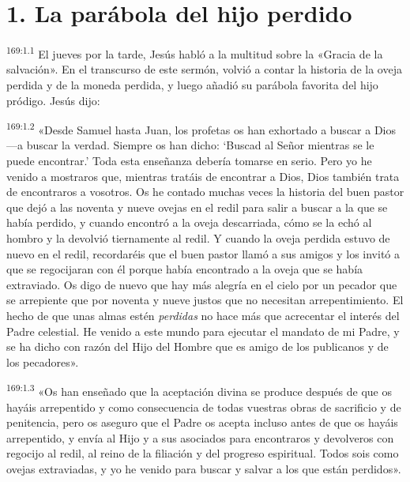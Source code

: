 \section*{1. La parábola del hijo perdido}
\par 
\textsuperscript{169:1.1} El jueves por la tarde, Jesús habló a la multitud sobre la «Gracia de la salvación». En el transcurso de este sermón, volvió a contar la historia de la oveja perdida y de la moneda perdida, y luego añadió su parábola favorita del hijo pródigo. Jesús dijo:

\par 
\textsuperscript{169:1.2} «Desde Samuel hasta Juan, los profetas os han exhortado a buscar a Dios ---a buscar la verdad. Siempre os han dicho: `Buscad al Señor mientras se le puede encontrar.' Toda esta enseñanza debería tomarse en serio. Pero yo he venido a mostraros que, mientras tratáis de encontrar a Dios, Dios también trata de encontraros a vosotros. Os he contado muchas veces la historia del buen pastor que dejó a las noventa y nueve ovejas en el redil para salir a buscar a la que se había perdido, y cuando encontró a la oveja descarriada, cómo se la echó al hombro y la devolvió tiernamente al redil. Y cuando la oveja perdida estuvo de nuevo en el redil, recordaréis que el buen pastor llamó a sus amigos y los invitó a que se regocijaran con él porque había encontrado a la oveja que se había extraviado. Os digo de nuevo que hay más alegría en el cielo por un pecador que se arrepiente que por noventa y nueve justos que no necesitan arrepentimiento. El hecho de que unas almas estén \textit{perdidas} no hace más que acrecentar el interés del Padre celestial. He venido a este mundo para ejecutar el mandato de mi Padre, y se ha dicho con razón del Hijo del Hombre que es amigo de los publicanos y de los pecadores».

\par 
\textsuperscript{169:1.3} «Os han enseñado que la aceptación divina se produce después de que os hayáis arrepentido y como consecuencia de todas vuestras obras de sacrificio y de penitencia, pero os aseguro que el Padre os acepta incluso antes de que os hayáis arrepentido, y envía al Hijo y a sus asociados para encontraros y devolveros con regocijo al redil, al reino de la filiación y del progreso espiritual. Todos sois como ovejas extraviadas, y yo he venido para buscar y salvar a los que están perdidos».


